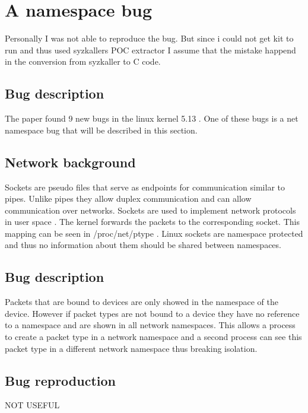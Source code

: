 \documentclass[10pt,twocolumn,a4paper]{article}
\begin{document}
\section{A namespace bug}\label{sec:bug}
Personally I was not able to reproduce the bug. But
since i could not get kit to run and thus used syzkallers POC extractor I assume that the mistake
happend in the conversion from syzkaller to C code\cite{0}.
\subsection{Bug description}
The paper found 9 new bugs in the linux kernel 5.13 \cite{0}. One of these bugs is a net namespace
bug that will be described in this section. 
\subsection{Network background}
Sockets are pseudo files that serve as endpoints for communication similar to pipes. Unlike pipes
they allow duplex communication and can allow communication over networks\cite{5}. Sockets are
used to implement network protocols in user space \cite{5}. The kernel forwards the packets to the
corresponding socket. This mapping can be seen in /proc/net/ptype \cite{6}. Linux sockets are
namespace protected and thus no information about them should be shared between namespaces.

\subsection{Bug description}
Packets that are bound to devices are only showed in the namespace of the device. However if packet
types are not bound to a device they have no reference to a namespace and are shown in all network
namespaces. This allows a process to create a packet type in a network namespace and a second
process can see this packet type in a different network namespace thus breaking isolation.


\subsection{Bug reproduction}
NOT USEFUL   %
\end{document}
